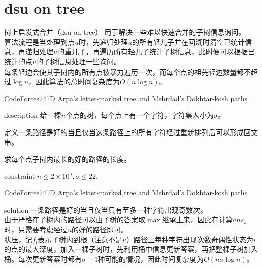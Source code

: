 \documentclass{beamer}
\begin{document}
\section{dsu on tree}
\begin{frame}{树上启发式合并（dsu on tree）}
	用于解决一些难以快速合并的子树信息询问。\\
	
	算法流程是当处理到点$u$时，先递归处理$u$的所有轻儿子并在回溯时清空已统计信息，再递归处理$u$的重儿子，再遍历所有轻儿子统计子树信息，此时便可以根据已统计的点$u$的子树信息处理一些询问。\\
	
	每条轻边会使其子树内的所有点被暴力遍历一次，而每个点的祖先轻边数量都不超过$\log n$，因此算法的总时间复杂度为$O(n\log n)$。
\end{frame}
\begin{frame}{CodeForces741D Arpa's letter-marked tree and Mehrdad's Dokhtar-kosh paths}
	\begin{block}{description}
		给一棵$n$个点的树，每个点上有一个字符，字符集大小为$\sigma$。
		
		定义一条路径是好的当且仅当这条路径上的所有字符经过重新排列后可以形成回文串。
		
		求每个点子树内最长的好的路径的长度。
	\end{block}
	\begin{block}{constraint}
		$n \le 2\times 10^5, \sigma \le 22.$
	\end{block}
\end{frame}
\begin{frame}{CodeForces741D Arpa's letter-marked tree and Mehrdad's Dokhtar-kosh paths}
	\begin{block}{solution}
		一条路径是好的当且仅当只有至多一种字符出现奇数次。\\
		
		由于严格在子树内的路径可以由子树的答案取$\max$继承上来，因此在计算$ans_u$时，只需要考虑经过$u$的好的路径即可。\\
		
		状压，记$f_i$表示子树内到根（注意不是$u$）路径上每种字符出现次数奇偶性状态为$i$的点的最大深度，加入一棵子树时，先利用桶中信息更新答案，再把整棵子树加入桶。每次更新答案时都有$\sigma +1$种可能的情况，因此时间复杂度为$O(n\sigma\log n)$。
	\end{block}
\end{frame}
\end{document}
